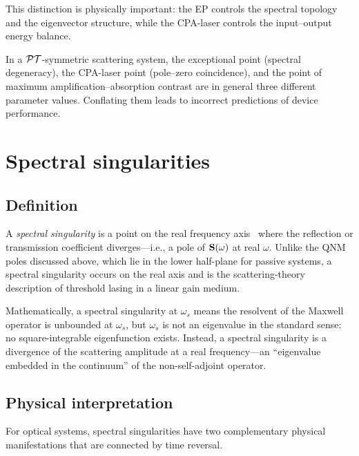 This distinction is physically important: the EP controls the spectral
topology and the eigenvector structure, while the CPA-laser controls the
input--output energy balance.

\begin{takeaway}
In a $\mathcal{PT}$-symmetric scattering system, the exceptional point (spectral
degeneracy), the CPA-laser point (pole--zero coincidence), and the point
of maximum amplification--absorption contrast are in general three
different parameter values. Conflating them leads to incorrect
predictions of device performance.
\end{takeaway}


\section{Spectral singularities}
\label{sec:spectral-singularities}

\subsection{Definition}
\label{ssec:spectral-sing-def}

A \emph{spectral singularity} is a point on the real frequency axis~\cite{longhi2010mml,chong2010symmetry}
where the reflection or transmission coefficient diverges---i.e., a pole
of $\mathbf{S}(\omega)$ at real $\omega$. Unlike the QNM poles discussed
above, which lie in the lower half-plane for passive systems, a spectral
singularity occurs on the real axis and is the scattering-theory
description of threshold lasing in a linear gain medium.

Mathematically, a spectral singularity at $\omega_s$ means the
resolvent of the Maxwell operator is unbounded at $\omega_s$, but
$\omega_s$ is not an eigenvalue in the standard sense: no
square-integrable eigenfunction exists. Instead, a spectral singularity
is a divergence of the scattering amplitude at a real frequency---an
``eigenvalue embedded in the continuum'' of the non-self-adjoint
operator.

\subsection{Physical interpretation}
\label{ssec:spectral-sing-physics}

For optical systems, spectral singularities have two complementary
physical manifestations that are connected by time reversal.

